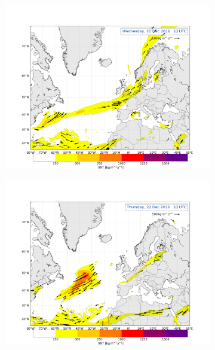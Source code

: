 \begin{figure}[!b]
	\begin{subfigure}[b]{0.49\textwidth}
		\includegraphics[trim={4.2cm 3.9cm 4.3cm 5.1cm},clip,
		width=\textwidth]{./fig_Atm_Riv/20161221_12}
		\caption{}\label{fig:AR21}
	\end{subfigure}
	\begin{subfigure}[b]{0.49\textwidth}
		\includegraphics[trim={4.2cm 3.9cm 4.3cm 5.1cm},clip,
		width=\textwidth]{./fig_Atm_Riv/20161222_12}
		\caption{}\label{fig:AR22}
	\end{subfigure}
	\begin{subfigure}[b]{\textwidth}

\end{subfigure}
\end{figure}
